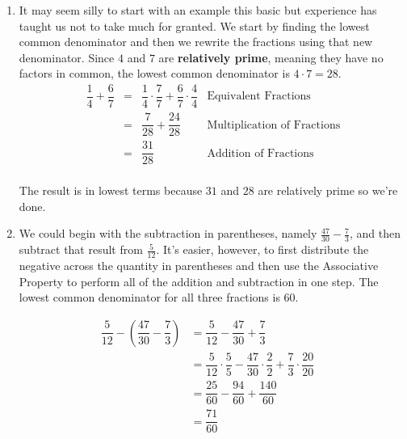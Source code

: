 {
\begin{enumerate}

\item It may seem silly to start with an example this basic but experience has taught us not to take much for granted.  We start by finding the lowest common denominator and then we rewrite the fractions using that new denominator.  Since $4$ and $7$ are {\bf relatively prime}, meaning they have no factors in common, the lowest common denominator is $4 \cdot 7 = 28$.\[ \begin{array}{rclr}

\dfrac{1}{4} + \dfrac{6}{7} & = & \dfrac{1}{4} \cdot \dfrac{7}{7} + \dfrac{6}{7} \cdot \dfrac{4}{4} &  \text{Equivalent Fractions} \\ [10pt]
                                           & = & \dfrac{7}{28}  + \dfrac{24}{28} & \text{Multiplication of Fractions}\\ [10pt]
																					 & = & \dfrac{31}{28}                  & \text{Addition of Fractions} \\ \end{array} \]

The result is in lowest terms because $31$ and $28$ are relatively prime so we're done.



\item  We could begin with the subtraction in parentheses, namely $\frac{47}{30} - \frac{7}{3}$, and then subtract that result from $\frac{5}{12}$.  It's easier, however, to first distribute the negative across the quantity in parentheses and then use the Associative Property to perform all of the addition and subtraction in one step.  The lowest common denominator for all three fractions is $60$.


\begin{align*}
\dfrac{5}{12} - \left(\dfrac{47}{30} - \dfrac{7}{3}\right) & = \dfrac{5}{12} - \dfrac{47}{30} + \dfrac{7}{3} \quad \tag*{Distribute the Negative}\\ 
& =  \dfrac{5}{12} \cdot \dfrac{5}{5} - \dfrac{47}{30} \cdot \dfrac{2}{2} + \dfrac{7}{3} \cdot \dfrac{20}{20} \quad \tag*{Equivalent Fractions}\\ 
& =  \dfrac{25}{60} - \dfrac{94}{60} + \dfrac{140}{60} \quad \tag*{Multiplication of Fractions} \\
& =  \dfrac{71}{60} \quad \tag*{Addition and Subtraction of Fractions} \\ \end{align*}


\end{enumerate}}
